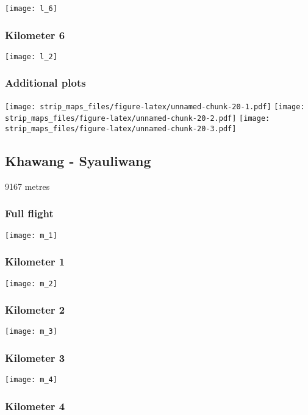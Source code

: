 \documentclass[]{article}
\begin{document}
\texttt{[image: l\_6]}

\subsubsection{Kilometer 6}\label{kilometer-6-8}

\texttt{[image: l\_2]}

\subsubsection{Additional plots}\label{additional-plots-11}

\texttt{[image: strip\_maps\_files/figure-latex/unnamed-chunk-20-1.pdf]}
\texttt{[image: strip\_maps\_files/figure-latex/unnamed-chunk-20-2.pdf]}
\texttt{[image: strip\_maps\_files/figure-latex/unnamed-chunk-20-3.pdf]}

\newpage

\subsection{Khawang - Syauliwang}\label{khawang---syauliwang}

9167 metres

\subsubsection{Full flight}\label{full-flight-12}

\texttt{[image: m\_1]}

\subsubsection{Kilometer 1}\label{kilometer-1-12}

\texttt{[image: m\_2]}

\subsubsection{Kilometer 2}\label{kilometer-2-12}

\texttt{[image: m\_3]}

\subsubsection{Kilometer 3}\label{kilometer-3-12}

\texttt{[image: m\_4]}

\subsubsection{Kilometer 4}\label{kilometer-4-12}
\end{document}
